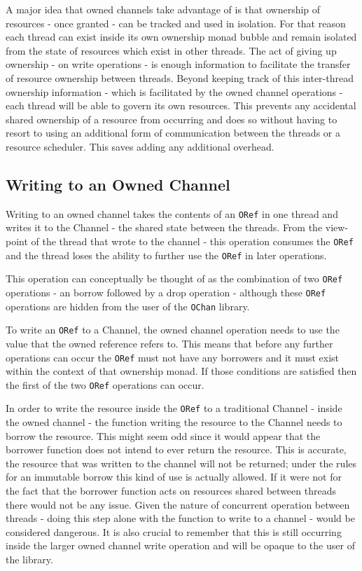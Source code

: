\documentclass[onehalf,11pt]{beavtex}
\begin{document}
A major idea that owned channels take advantage of is that ownership
of resources - once granted - can be tracked and used in isolation. For that reason
each thread can exist inside its own ownership monad bubble and
remain isolated from the state of resources which exist in other threads.
The act of giving up ownership - on write operations - is enough information to
facilitate the transfer of resource ownership between threads.
Beyond keeping track of this inter-thread ownership information - which is
facilitated by the owned channel operations - each thread will be able
to govern its own resources.  This prevents any accidental shared ownership of
a resource from occurring and does so without having to resort to using an
additional form of communication between the threads or a resource scheduler.
This saves adding any additional overhead.



\subsection{Writing to an Owned Channel}

Writing to an owned channel takes the contents of an \texttt{ORef} in
one thread and writes it to the Channel - the shared state between the threads.
From the view-point of the thread that wrote to the channel - this operation
consumes the \texttt{ORef} and the thread loses the ability to further use the
\texttt{ORef} in later operations.

This operation can conceptually be thought of as the combination of two
\texttt{ORef} operations - an borrow followed by a drop operation -
although these \texttt{ORef} operations are hidden from the user of the
\texttt{OChan} library.

To write an \texttt{ORef} to a Channel, the owned channel operation
needs to use the value that the owned reference refers to.  This means
that before any further operations can occur the \texttt{ORef} must not have any
borrowers and it must exist within the context of that ownership monad.
If those conditions are satisfied then the first of the two \texttt{ORef}
operations can occur.

In order to write the resource inside the \texttt{ORef} to a traditional Channel
- inside the owned channel - the function writing the resource to the
Channel needs to borrow the resource.
This might seem odd since it would appear that the borrower function does not
intend to ever return the resource.  This is accurate, the resource that was
written to the channel will not be returned; under the rules for an immutable
borrow this kind of use is actually allowed.  If it were not for the fact that
the borrower function acts on resources shared between threads there would not be
any issue.  Given the nature of concurrent operation between threads - doing
this step alone with the function to write to a channel - would be considered
dangerous.  It is also crucial to remember that this is still occurring inside
the larger owned channel write operation and will be opaque to the user
of the library.
\end{document}
